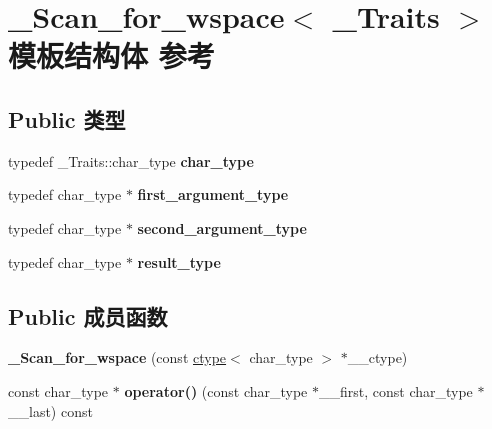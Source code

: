 \hypertarget{struct___scan__for__wspace}{}\section{\+\_\+\+Scan\+\_\+for\+\_\+wspace$<$ \+\_\+\+Traits $>$ 模板结构体 参考}
\label{struct___scan__for__wspace}
\subsection*{Public 类型}
\begin{DoxyCompactItemize}
\item 
\mbox{\label{struct___scan__for__wspace_a97ab8d991569b3985da1cec8b26c535d}} 
typedef \+\_\+\+Traits\+::char\+\_\+type {\bfseries char\+\_\+type}
\item 
\mbox{\label{struct___scan__for__wspace_ad284fa19372cba5946c6ca13f12d4d9a}} 
typedef char\+\_\+type $\ast$ {\bfseries first\+\_\+argument\+\_\+type}
\item 
\mbox{\label{struct___scan__for__wspace_addbf1a3f968e9d89bd16eae76ccebf98}} 
typedef char\+\_\+type $\ast$ {\bfseries second\+\_\+argument\+\_\+type}
\item 
\mbox{\label{struct___scan__for__wspace_a5510b26a93de5db76b40fd4f0296f5ab}} 
typedef char\+\_\+type $\ast$ {\bfseries result\+\_\+type}
\end{DoxyCompactItemize}
\subsection*{Public 成员函数}
\begin{DoxyCompactItemize}
\item 
\mbox{\label{struct___scan__for__wspace_a9211cd0df0a0b97aaa704d32e05812fb}} 
{\bfseries \+\_\+\+Scan\+\_\+for\+\_\+wspace} (const \hyperlink{classctype}{ctype}$<$ char\+\_\+type $>$ $\ast$\+\_\+\+\_\+ctype)
\item 
\mbox{\label{struct___scan__for__wspace_a3d48d1f7240b61fd0e497d0c47206e4e}} 
const char\+\_\+type $\ast$ {\bfseries operator()} (const char\+\_\+type $\ast$\+\_\+\+\_\+first, const char\+\_\+type $\ast$\+\_\+\+\_\+last) const
\end{DoxyCompactItemize}
